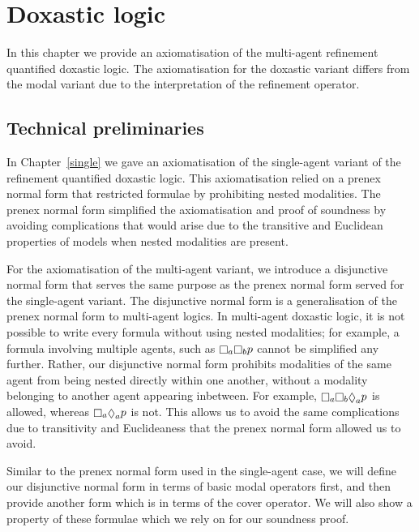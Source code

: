 \chapter{Doxastic logic}\label{kd45}

In this chapter we provide an axiomatisation of the multi-agent refinement
quantified doxastic logic. The axiomatisation for the doxastic variant differs
from the modal variant due to the interpretation of the refinement operator.

\section{Technical preliminaries}

In Chapter~\ref{single} we gave an axiomatisation of the single-agent variant of
the refinement quantified doxastic logic. This axiomatisation relied on a
prenex normal form that restricted formulae by prohibiting nested modalities.
The prenex normal form simplified the axiomatisation and proof of soundness by
avoiding complications that would arise due to the transitive and Euclidean
properties of \classKD{} models when nested modalities are present.

For the axiomatisation of the multi-agent variant, we introduce a disjunctive
normal form that serves the same purpose as the prenex normal form served for
the single-agent variant. The disjunctive normal form is a generalisation of the
prenex normal form to multi-agent logics. In multi-agent doxastic logic, it is
not possible to write every formula without using nested modalities; for
example, a formula involving multiple agents, such as $\knows_a \knows_b p$
cannot be simplified any further. Rather, our disjunctive normal form prohibits
modalities of the same agent from being nested directly within one another,
without a modality belonging to another agent appearing inbetween. For example,
$\knows_a \knows_b \suspects_a p$ is allowed, whereas $\knows_a \suspects_a p$ is
not. This allows us to avoid the same complications due to transitivity and
Euclideaness that the prenex normal form allowed us to avoid.

Similar to the prenex normal form used in the single-agent case, we will define
our disjunctive normal form in terms of basic modal operators first, and then
provide another form which is in terms of the cover operator. We will also show
a property of these formulae which we rely on for our soundness proof.

